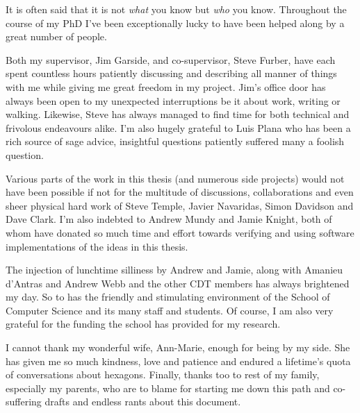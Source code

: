 {
	
	
	It is often said that it is not \emph{what} you know but \emph{who} you know.
	Throughout the course of my PhD I've been exceptionally lucky to have been
	helped along by a great number of people.
	
	Both my supervisor, Jim Garside, and co-supervisor, Steve Furber, have each
	spent countless hours patiently discussing and describing all manner of
	things with me while giving me great freedom in my project. Jim's office door
	has always been open to my unexpected interruptions be it about work, writing
	or walking.  Likewise, Steve has always managed to find time for both
	technical and frivolous endeavours alike. I'm also hugely grateful to Luis
	Plana who has been a rich source of sage advice, insightful questions
	patiently suffered many a foolish question.
	
	Various parts of the work in this thesis (and numerous side projects) would
	not have been possible if not for the multitude of discussions,
	collaborations and even sheer physical hard work of Steve Temple, Javier
	Navaridas, Simon Davidson and Dave Clark. I'm also indebted to Andrew Mundy
	and Jamie Knight, both of whom have donated so much time and effort towards
	verifying and using software implementations of the ideas in this thesis.
	
	The injection of lunchtime silliness by Andrew and Jamie, along with Amanieu
	d'Antras and Andrew Webb and the other CDT members has always brightened my
	day. So to has the friendly and stimulating environment of the School of
	Computer Science and its many staff and students. Of course, I am also very
	grateful for the funding the school has provided for my research.
	
	I cannot thank my wonderful wife, Ann-Marie, enough for being by my side. She
	has given me so much kindness, love and patience and endured a lifetime's
	quota of conversations about hexagons. Finally, thanks too to rest of my
	family, especially my parents, who are to blame for starting me down this
	path and co-suffering drafts and endless rants about this document.
	
	\par%
}
